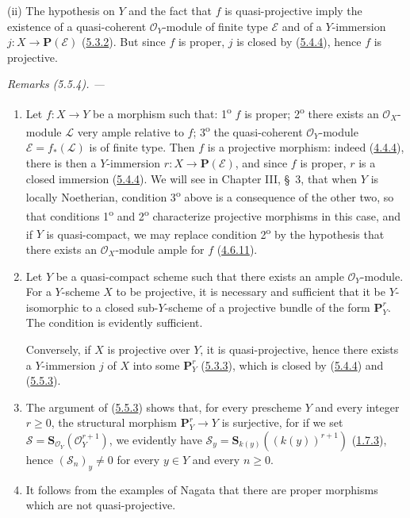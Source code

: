 (ii) The hypothesis on $Y$ and the fact that $f$ is quasi-projective imply
the existence of a quasi-coherent $\mathcal{O}_Y$-module of finite type
$\mathcal{E}$ and of a $Y$-immersion $j:X\to\mathbf{P}(\mathcal{E})$
(\hyperref[II.5.3.2]{5.3.2}). But since $f$ is proper, $j$ is closed by
(\hyperref[II.5.4.4]{5.4.4}), hence $f$ is projective.

\par\medskip\noindent\textit{Remarks (5.5.4). ---\ }
\begin{enumerate}
  \item[\rm{(i)}] Let $f:X\to Y$ be a morphism such that:
  1\textsuperscript{o} $f$ is proper; 2\textsuperscript{o} there exists an
  $\mathcal{O}_X$-module $\mathcal{L}$ very ample relative to $f$;
  3\textsuperscript{o} the quasi-coherent $\mathcal{O}_Y$-module
  $\mathcal{E}=f_*(\mathcal{L})$ is of finite type. Then $f$ is a projective
  morphism: indeed (\hyperref[II.4.4.4]{4.4.4}), there is then a
  $Y$-immersion $r:X\to\mathbf{P}(\mathcal{E})$, and since $f$ is proper, $r$
  is a closed immersion (\hyperref[II.5.4.4]{5.4.4}). We will see in
  Chapter III, \S~3, that when $Y$ is locally Noetherian, condition
  3\textsuperscript{o} above is a consequence of the other two, so that
  conditions 1\textsuperscript{o} and 2\textsuperscript{o} characterize
  projective morphisms in this case, and if $Y$ is quasi-compact, we may
  replace condition 2\textsuperscript{o} by the hypothesis that there exists
  an $\mathcal{O}_X$-module ample for $f$
  (\hyperref[II.4.6.11]{4.6.11}).
  \item[\rm{(ii)}] Let $Y$ be a quasi-compact scheme such that there exists
  an ample $\mathcal{O}_Y$-module. For a $Y$-scheme $X$ to be projective, it
  is necessary and sufficient that it be $Y$-isomorphic to a closed
  sub-$Y$-scheme of a projective bundle of the form $\mathbf{P}_Y^r$. The
  condition is evidently sufficient.


  Conversely, if $X$ is projective over $Y$, it is quasi-projective, hence
  there exists a $Y$-immersion $j$ of $X$ into some $\mathbf{P}_Y^r$
  (\hyperref[II.5.3.3]{5.3.3}), which is closed by
  (\hyperref[II.5.4.4]{5.4.4}) and
  (\hyperref[II.5.5.3]{5.5.3}).
  \item[\rm{(iii)}] The argument of
  (\hyperref[II.5.5.3]{5.5.3}) shows that, for every prescheme $Y$ and
  every integer $r\geq0$, the structural morphism $\mathbf{P}_Y^r\to Y$ is
  surjective, for if we set
  $\mathcal{S}=\mathbf{S}_{\mathcal{O}_Y}(\mathcal{O}_Y^{r+1})$, we
  evidently have $\mathcal{S}_y=\mathbf{S}_{k(y)}((k(y))^{r+1})$
  (\hyperref[II.1.7.3]{1.7.3}), hence $(\mathcal{S}_n)_y\neq0$ for every
  $y\in Y$ and every $n\geq0$.
  \item[\rm{(iv)}] It follows from the examples of Nagata \cite{II-26} that
  there are proper morphisms which are not quasi-projective.
\end{enumerate}

